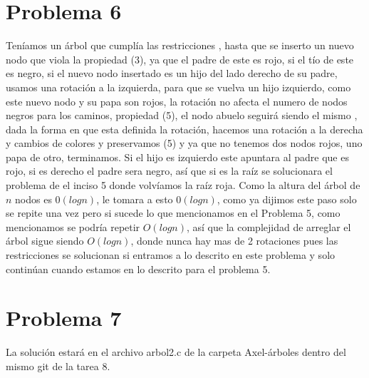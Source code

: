 \documentclass[12pt,letterpaper]{article}
\begin{document}
\section{Problema 6}
    Teníamos un árbol que cumplía las restricciones , hasta que se inserto un nuevo nodo que viola la propiedad (3), ya que el padre de este es rojo, si el tío de este es negro, si el nuevo nodo insertado es un hijo del lado derecho de su padre, usamos una rotación a la izquierda, para que se vuelva un hijo izquierdo, como este nuevo nodo y su papa son rojos, la rotación no afecta el numero de nodos negros para los caminos, propiedad (5), el nodo abuelo seguirá siendo el mismo , dada la forma en que esta definida la rotación, hacemos una rotación a la derecha y cambios de colores y preservamos (5) y ya que no tenemos dos nodos rojos, uno papa de otro, terminamos. Si el hijo es izquierdo este apuntara al padre que es rojo, si es derecho el padre sera negro, así que si es la raíz se solucionara el problema de el inciso 5 donde volvíamos la raíz roja. Como la altura del árbol de $n$ nodos es $0(log n)$, le tomara a esto $0(log n)$, como ya dijimos este paso solo se repite una vez pero si sucede lo que mencionamos en el Problema 5, como mencionamos se podría repetir $O(log n)$, así que la complejidad de arreglar el árbol sigue siendo $O(log n)$, donde nunca hay mas de 2 rotaciones pues las restricciones se solucionan si entramos a lo descrito en este problema y solo continúan cuando estamos en lo descrito para el problema 5.   
    
\section{Problema 7}
La solución estará en el archivo arbol2.c de la carpeta Axel-árboles dentro del mismo git de la tarea 8. 
\end{document}
